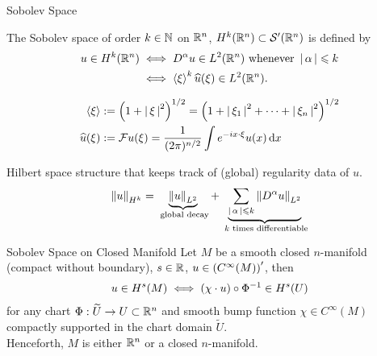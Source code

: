 \documentclass{beamer}
\begin{document}
\begin{frame}{Sobolev Space}
\begin{definition}
    The Sobolev space of order $k \in \N$ on $\R^n$,  $H^k(\R^n) \subset \sch'(\R^n)$  is defined by 
    \begin{align*}
    u \in H^k(\R^n) 
    &\iff D^\alpha u \in L^2(\R^n) \text{ whenever } \abs{\alpha} \leq k\\
    &\iff \sym[\xi]^k \widehat{u}(\xi) \in L^2(\R^n). 
    \end{align*}
\end{definition}

\begin{align*}
\sym[\xi] &:= \brac{1 + \abs{\xi}^2}^{1/2} = \brac{1 + \abs{\xi_1}^2+ \dots + \abs{\xi_n}^2}^{1/2} \\
\widehat{u}(\xi) &:= \F u(\xi)  = \frac{1}{(2\pi)^{n/2}} \int e^{-ix \cdot \xi} u(x)\d[x] 
\end{align*}

Hilbert space structure that keeps track of (global) regularity data of $u$. 
\begin{align*}
    \norm[u]_{H^k} = \underbrace{\norm[u]_{L^2}}_{\text{ global decay}}  + \underbrace{\sum_{\abs{\alpha} \leq k} \norm[D^\alpha u ]_{L^2} }_{\text{ $k$ times differentiable}} 
\end{align*}

\end{frame} 


\begin{frame}{Sobolev Space on Closed Manifold}
Let $M$ be a smooth closed $n$-manifold (compact without boundary), $s \in \R$, $u \in \brac{C^\infty(M)}'$, then 
\begin{align*}
u \in H^s(M) \iff \brac{\chi \cdot  u} \circ \Phi^{-1} \in H^s(U)
\end{align*} 
for any chart $\Phi : \widetilde{U} \to U \subset \R^n$ and smooth bump function $\chi \in C^\infty(M)$ compactly supported in the chart domain $\widetilde{U}$. \\[3em]
\pause 
Henceforth, $M$ is either $\R^n$ or a closed $n$-manifold. 
\end{frame} 
\end{document}

